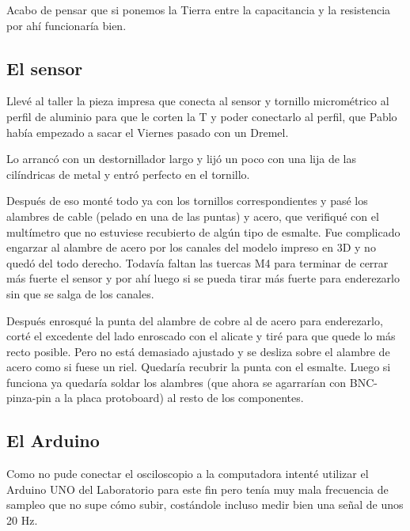 Acabo de pensar que si ponemos la Tierra entre la capacitancia y la resistencia por ahí funcionaría bien.



\subsection*{El sensor}
Llevé al taller la pieza impresa que conecta al sensor y tornillo micrométrico al perfil de aluminio para que le corten la T y poder conectarlo al perfil, que Pablo había empezado a sacar el Viernes pasado con un Dremel. 

Lo arrancó con un destornillador largo y lijó un poco con una lija de las cilíndricas de metal y entró perfecto en el tornillo. 

Después de eso monté todo ya con los tornillos correspondientes y pasé los alambres de cable (pelado en una de las puntas) y acero, que verifiqué con el multímetro que no estuviese recubierto de algún tipo de esmalte. Fue complicado engarzar al alambre de acero por los canales del modelo impreso en 3D y no quedó del todo derecho. Todavía faltan las tuercas M4 para terminar de cerrar más fuerte el sensor y por ahí luego si se pueda tirar más fuerte para enderezarlo sin que se salga de los canales. %

Después enrosqué la punta del alambre de cobre al de acero para enderezarlo, corté el excedente del lado enroscado con el alicate y tiré para que quede lo más recto posible. Pero no está demasiado ajustado y se desliza sobre el alambre de acero como si fuese un riel. Quedaría recubrir la punta con el esmalte. Luego si funciona ya quedaría soldar los alambres (que ahora se agarrarían con BNC-pinza-pin a la placa protoboard) al resto de los componentes.


\subsection*{El Arduino} 
Como no pude conectar el osciloscopio a la computadora intenté utilizar el Arduino UNO del Laboratorio para este fin pero tenía muy mala frecuencia de sampleo que no supe cómo subir, costándole incluso medir bien una señal de unos 20 Hz. %